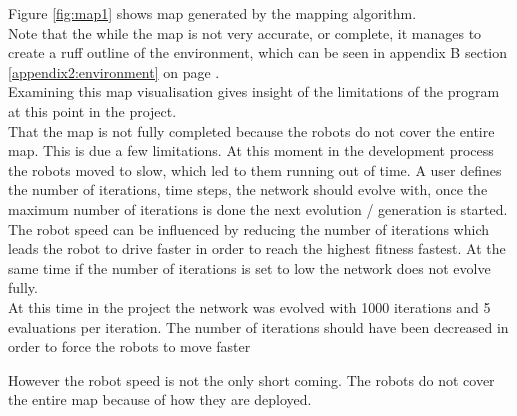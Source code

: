 Figure \ref{fig:map1} shows map generated by the mapping algorithm.\\
Note that the while the map is not very accurate, or complete, it manages to create a ruff outline of the environment, which can be seen in appendix B section \ref{appendix2:environment} on page \pageref{appendix2:environment}. \\

Examining this map visualisation gives insight of the limitations of the program at this point in the project.\\
That the map is not fully completed because the robots do not cover the entire map. This is due a few limitations. At this moment in the development process the robots moved to slow, which led to them running out of time. 
A user defines the number of iterations, time steps,  the network should evolve with, once the maximum number of iterations is done the next evolution / generation is started.\\
The robot speed can be influenced by reducing the number of iterations which leads the robot to drive faster in order to reach the highest fitness fastest. At the same time if the number of iterations is set to low the network does not evolve fully. \\
At this time in the project the network was evolved with 1000 iterations and 5 evaluations per iteration.  The number of iterations should have been decreased in order to force the robots to move faster 

However the robot speed is not the only short coming. The robots do not cover the entire map because of how they are deployed. \\

